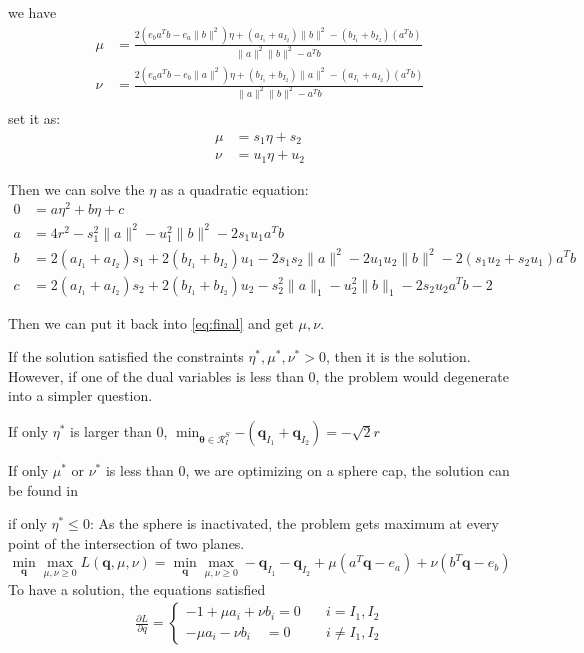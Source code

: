 \documentclass[twoside]{article}
\theoremstyle{plain}
\renewcommand{\vec}[1]{\bm{#1}}
\begin{document}
we have 
\begin{equation}
\begin{split} 
\mu &= \frac{2( e_ba^Tb - e_a\|b\|^2 )\eta + (a_{I_1}+a_{I_2}) \|b\|^2 - (b_{I_1} + b_{I_2}) (a^Tb)}{ \|a\|^2 \|b\|^2 -a^Tb}\\
\nu &=\frac{2( e_aa^Tb - e_b\|a\|^2 )\eta + (b_{I_1}+b_{I_2}) \|a\|^2 - (a_{I_1} + a_{I_2}) (a^Tb)}{ \|a\|^2 \|b\|^2 -a^Tb}\\
 \end{split}
\end{equation}
set it as:
\begin{equation}
\begin{split} 
\mu &= s_1 \eta + s_2\\ 
\nu &= u_1 \eta + u_2
 \end{split}
 \label{eq:final}
\end{equation}

Then we can solve the $\eta$ as a quadratic equation:
\begin{equation}
\begin{split} 
0&=a\eta^2+b\eta+c\\
 a&= 4r^2 - s_1^2\|a\|^2 - u_1^2\|b\|^2 -2s_1 u_1a^Tb\\
b&=2(a_{I_1} + a_{I_2})s_1 +2(b_{I_1} + b_{I_2})u_1 - 2s_1s_2 \|a\|^2 - 2u_1u_2\|b\|^2 - 2(s_1u_2+s_2u_1)a^Tb \\
 c&=2(a_{I_1} + a_{I_2})s_2 +2(b_{I_1} + b_{I_2})u_2 -s_2^2\|a\|_1 -u_2^2\|b\|_1 - 2s_2u_2a^Tb -2
 \end{split}
\end{equation}

Then we can put it back into \ref{eq:final} and get $\mu, \nu$.

If the solution satisfied the constraints $\eta^{*}, \mu^{*}, \nu^{*} > 0$, then it is the solution.
However, if one of the dual variables is less than 0, the problem would degenerate into a simpler question. 

If only $\eta^{*}$ is larger than 0, 
 $\min_{\vec{\theta} \in \mathcal{R}^{S}_{I}}{- ( \vec{q}_{I_1} +\vec{q}_{I_2} )} = -\sqrt{2}r$

If only $\mu^{*}$ or $\nu^{*}$ is less than 0, we are optimizing on a sphere cap, the solution can be found in \cite[Appendix B]{NEURIPS2021_7b5b23f4}

if only $\eta^{*} \leq 0$:
As the sphere is inactivated, the problem gets maximum at every point of the intersection of two planes.
\begin{equation}
\min_{\vec{q}} \max_{\mu,\nu \geq 0} L(\vec{q},\mu,\nu) =\min_{\vec{q}}\max_{\mu,\nu\geq0} - {\vec{q}_{I_1} - \vec{q}_{I_2} +\mu( a^T\vec{q} - e_a ) + \nu( b^T\vec{q} - e_b )}
\end{equation}
To have a solution, the equations satisfied
 \begin{equation}
\begin{split} 
\frac{\partial L}{\partial q} = \left\{
\begin{aligned}
-1+\mu a_i + \nu b_i =0 \quad& i = I_1, I_2\\
-\mu a_i -\nu b_i \quad =0& i \neq I_1, I_2
\end{aligned}
\right.
 \end{split}
\end{equation}
\end{document}
